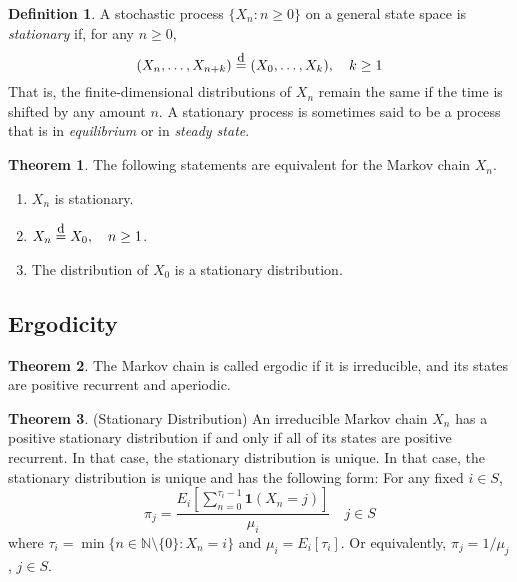 \documentclass[twoside]{article}
\theoremstyle{definition}
\newtheorem{definition}{Definition}[section]
\newtheorem{theorem}{Theorem}[section]
\theoremstyle{remark}
\theoremstyle{remark}
\newcommand\deq{\mathrel{\overset{\makebox[0pt]{\mbox{\normalfont\small d}}}{=}}}
\begin{document}
\begin{definition}
  A stochastic process ${\{ X_n : n \geq 0 \}}$ on a general state space is
  \textit{stationary} if, for any $n \geq 0$,
  \begin{equation}
    (X_n, \ldots, X_{n+k}) \deq (X_0, \ldots, X_k), \quad k \geq 1
  \end{equation}
  That is, the finite-dimensional distributions of $X_n$ remain the same if
  the time is shifted by any amount $n$. A stationary process is sometimes
  said to be a process that is in \textit{equilibrium} or in \textit{steady
  state}.
\end{definition}

\begin{theorem}
  The following statements are equivalent for the Markov chain $X_n$.
  \begin{enumerate}
    \item $X_n$ is stationary.
    \item $X_n \deq X_0, \quad n \geq 1$.
    \item The distribution of $X_0$ is a stationary distribution.
  \end{enumerate}
\end{theorem}

\subsection{Ergodicity}
\begin{theorem}
   The Markov chain is called ergodic if it is irreducible, and its
   states are positive recurrent and aperiodic.
\end{theorem}

\begin{theorem}
  (Stationary Distribution)  An irreducible Markov chain $X_n$ has
  a positive stationary distribution if and only if all of its states
  are positive recurrent. In that case, the stationary distribution
  is unique. In that case, the stationary distribution is unique and
  has the following form: For any fixed $i \in S$,
  \begin{equation}
    \pi_j
    = \frac{E_i \left[ \sum_{n=0}^{\tau_i - 1} \mathbf{1}(X_n = j) \right]}{\mu_i}
    \quad j \in S
  \end{equation}
  where $\tau_i = \min{\{ n \in \mathbb{N}\setminus{\{0\}} : X_n = i\}}$ and
  $\mu_i = E_i [\tau_i]$. Or equivalently, $\pi_j = 1/\mu_j$, $j \in S$.
\end{theorem}
\end{document}
